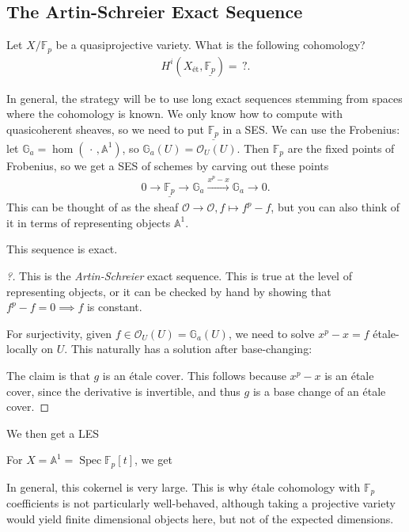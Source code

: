 \hypertarget{the-artin-schreier-exact-sequence}{%
\subsection{The Artin-Schreier Exact
Sequence}\label{the-artin-schreier-exact-sequence}}

\begin{example}[?]

Let \(X/{\mathbb{F}}_p\) be a quasiprojective variety. What is the
following cohomology?
\begin{align*}  
H^i(X_\text{ét}, \underline{{\mathbb{F}}_p})  = \, ?
.\end{align*}

In general, the strategy will be to use long exact sequences stemming
from spaces where the cohomology is known. We only know how to compute
with quasicoherent sheaves, so we need to put
\(\underline{{\mathbb{F}}_p}\) in a SES. We can use the Frobenius: let
\({\mathbb{G}}_a = \hom({\,\cdot\,}, {\mathbb{A}}^1)\), so
\({\mathbb{G}}_a(U) = {\mathcal{O}}_U(U)\). Then \({\mathbb{F}}_p\) are
the fixed points of Frobenius, so we get a SES of schemes by carving out
these points
\begin{align*}  
0 \to
\underline{{\mathbb{F}}_p} \to
{\mathbb{G}}_a \xrightarrow{x^p - x}
{\mathbb{G}}_a \to 
0
.\end{align*}
This can be thought of as the sheaf
\({\mathcal{O}}\to {\mathcal{O}}, f \mapsto f^p -f\), but you can also
think of it in terms of representing objects \({\mathbb{A}}^1\).

\begin{claim}

This sequence is exact.

\end{claim}

\begin{proof}[?]

This is the \emph{Artin-Schreier} exact sequence. This is true at the
level of representing objects, or it can be checked by hand by showing
that \(f^p - f = 0 \implies f\) is constant.

For surjectivity, given \(f\in {\mathcal{O}}_U(U) = {\mathbb{G}}_a(U)\),
we need to solve \(x^p - x = f\) étale-locally on \(U\). This naturally
has a solution after base-changing:

The claim is that \(g\) is an étale cover. This follows because
\(x^p-x\) is an étale cover, since the derivative is invertible, and
thus \(g\) is a base change of an étale cover.

\end{proof}

We then get a LES

For \(X = {\mathbb{A}}^1 = \operatorname{Spec}{\mathbb{F}}_p[t]\), we
get

In general, this cokernel is very large. This is why étale cohomology
with \({\mathbb{F}}_p\) coefficients is not particularly well-behaved,
although taking a projective variety would yield finite dimensional
objects here, but not of the expected dimensions.

\end{example}

